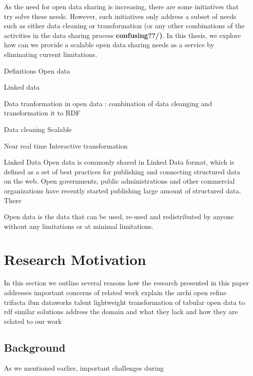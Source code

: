 As the need for open data sharing is increasing, there are some  initiatives that try  solve these needs. However, such initiatives only address a subset of needs such as either data cleaning or transformation (or any other combinations of the activities in the data sharing process\textbf{ confusing??/)}.  In this thesis, we explore how can we provide a scalable open data sharing needs as a service by eliminating current limitations. 




Definitions  
Open data 

Linked data 

Data tranformation in open data : combination of data cleanging and transformation it to RDF

Data cleaning 
Scalable

Near real time 
Interactive transformation 

Linked Data
Open data is commonly shared in Linked Data format, which is defined as a set of best practices for publishing and connecting structured data on the web\cite{linkeddatasofar}.  Open governments, public administrations and other commercial organizations have recently started publishing large amount of structured data. There 

Open data is the data that can be used, re-used and redistributed by anyone without any limitations or at minimal limitations\cite{opendatahandbook}. 



\section{Research Motivation}

In this section we outline several reasons how the research presented in this paper  addresses important concerns of 
related work 
explain the archi
open refine
trifacta
ibm dataworks
talent 
lightweight transformation of tabular open data to rdf
similar solutions address the domain and what they lack and how they are related to our work


\subsection{Background}

\noindent As we mentioned earlier, important challenges during 


